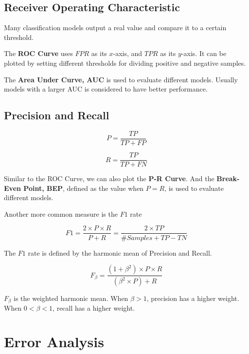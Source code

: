 \subsection{Receiver Operating Characteristic}
Many classification models output a real value and compare it to a certain threshold.

The \textbf{ROC Curve} uses $FPR$ as its $x$-axis, and $TPR$ as its $y$-axis. It can be plotted by setting different thresholds for dividing positive and negative samples.

The \textbf{Area Under Curve, AUC} is used to evaluate different models. Usually models with a larger AUC is considered to have better performance.

\subsection{Precision and Recall}
\begin{definition}[Precision]
    \[ P = \frac{TP}{TP + FP} \]
\end{definition}
\begin{definition}[Recall]
    \[ R = \frac{TP}{TP + FN} \]
\end{definition}
Similar to the ROC Curve, we can also plot the \textbf{P-R Curve}. And the \textbf{Break-Even Point, BEP}, defined as the value when $P = R$, is used to evaluate different models.

Another more common measure is the $F1$ rate
\begin{definition}[$F1$ Rate]
    \[ F1 = \frac{2 \times P \times R}{P + R} = \frac{2 \times TP}{\#Samples + TP - TN} \]
\end{definition}
\begin{remark}
    The $F1$ rate is defined by the harmonic mean of Precision and Recall.
\end{remark}

\begin{definition}
    \[ F_{\beta} = \frac{(1+\beta^2)\times P \times R}{(\beta^2 \times P)+R} \]
\end{definition}
\begin{remark}
    $F_{\beta}$ is the weighted harmonic mean. When $\beta > 1$, precision has a higher weight. When $0 < \beta < 1$, recall has a higher weight.
\end{remark}

\section{Error Analysis}
